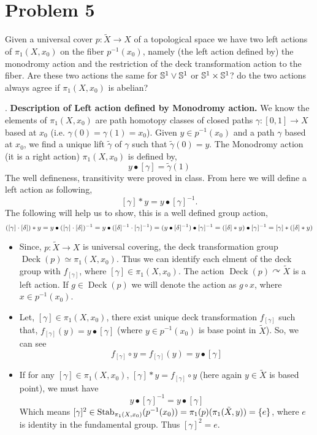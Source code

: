 \documentclass[11pt]{article}
\begin{document}
\section{Problem 5}

\begin{prob}{}{}
    Given a universal cover $p : \widetilde{X} \to X$ of a topological space we have two left actions of $\pi_1(X,x_0)$ on the fiber $p^{-1}(x_0)$, namely (the left action defined by) the monodromy action and the restriction of the deck transformation action to the fiber. Are these two actions the same for $\mathbb{S}^1 \vee \mathbb{S}^1$ or $\mathbb{S}^1 \times \mathbb{S}^1$? do the two actions always agree if $\pi_1(X,x_0)$ is abelian?
\end{prob}

\sol. \textbf{\textsf{Description of Left action defined by Monodromy action.}} We  know the elements of $\pi_1(X,x_0)$ are path homotopy classes of closed paths $\gamma : [0,1] \to X$ based at $x_0$ (i.e. $\gamma(0) = \gamma(1) = x_0$). Given $y \in  p^{-1}(x_0)$ and a path $\gamma$ based at $x_0$, we find a unique lift $\tilde \gamma$ of $\gamma$ such that $\tilde \gamma (0) = y$. The Monodromy action (it is a right action) $\pi_1(X,x_0)$ is defined by, 
$$y\bullet [\gamma]= \tilde{\gamma}(1)$$
The well defineness, transitivity were proved in class. From here we will define a left action as following,
$$[\gamma] * y = y \bullet [\gamma]^{-1} .$$
The following will help us to show, this is a well defined group action, 
$$([\gamma] \cdot [\delta]) * y = y \bullet ([\gamma] \cdot [\delta])^{-1} = y \bullet ([\delta]^{-1} \cdot [\gamma]^{-1}) = (y \bullet [\delta]^{-1}) \bullet [\gamma]^{-1} = ([\delta] * y ) \bullet [\gamma]^{-1} \\= [\gamma] * ([\delta] * y)$$
\begin{itemize}
  \item Since, $p : \tilde{X} \to X$ is universal covering, the deck transformation group $\operatorname{Deck}(p)\simeq \pi_1(X,x_0)$. Thus we can identify each elment of the deck group with $f_{[\gamma]}$, where $[\gamma] \in \pi_1(X,x_0)$. The action $\operatorname{Deck} (p) \curvearrowright \tilde{X}$ is a left action. If $g\in \operatorname{Deck}(p)$ we will denote the action as $g \circ x$, where $x \in p^{-1}(x_0)$.
  \item Let, $[\gamma] \in \pi_1(X,x_0)$, there exist unique deck transformation $f_{[\gamma]}$ such that, $f_{[\gamma]}(y) = y\bullet [\gamma]$ (where $y \in p^{-1}(x_0)$ is base point in $\tilde{X}$). So, we can see $$f_{[\gamma]} \circ y = f_{[\gamma]}(y)= y \bullet [\gamma]$$
  \item If for any $[\gamma] \in \pi_1(X,x_0)$, $[\gamma]\ast y = f_{[\gamma]} \circ y$ (here again $y \in \tilde{X}$ is based point), we must have $$y \bullet [\gamma]^{-1} = y \bullet [\gamma]$$
  Which means $[\gamma]^2 \in \operatorname{Stab}_{\pi_1(X,x_0)}(p^{-1}(x_0)) = \pi_1(p)(\pi_1(\tilde{X},y))= \qty{e}$, where $e$ is identity in the fundamental group. Thus $[\gamma]^2 = e$.
\end{itemize}
\end{document}
